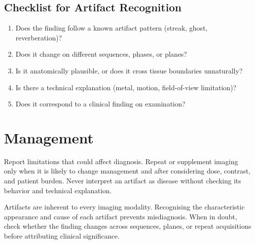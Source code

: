 \subsection{Checklist for Artifact Recognition}
\begin{enumerate}
    \item Does the finding follow a known artifact pattern (streak, ghost, reverberation)?
    \item Does it change on different sequences, phases, or planes?
    \item Is it anatomically plausible, or does it cross tissue boundaries unnaturally?
    \item Is there a technical explanation (metal, motion, field-of-view limitation)?
    \item Does it correspond to a clinical finding on examination?
\end{enumerate}

\section{Management}
Report limitations that could affect diagnosis. Repeat or supplement imaging only when it is likely to change management and after considering dose, contrast, and patient burden. Never interpret an artifact as disease without checking its behavior and technical explanation.

\begin{pearlbox}[Impression:]
Artifacts are inherent to every imaging modality. Recognising the characteristic appearance and cause of each artifact prevents misdiagnosis. When in doubt, check whether the finding changes across sequences, planes, or repeat acquisitions before attributing clinical significance.
\end{pearlbox}

\clearpage
